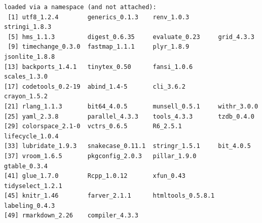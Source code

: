 \documentclass[
  letterpaper,
  DIV=11,
  numbers=noendperiod]{scrartcl}
\begin{document}
\begin{tcolorbox}
\begin{verbatim}
loaded via a namespace (and not attached):
 [1] utf8_1.2.4        generics_0.1.3    renv_1.0.3        stringi_1.8.3    
 [5] hms_1.1.3         digest_0.6.35     evaluate_0.23     grid_4.3.3       
 [9] timechange_0.3.0  fastmap_1.1.1     plyr_1.8.9        jsonlite_1.8.8   
[13] backports_1.4.1   tinytex_0.50      fansi_1.0.6       scales_1.3.0     
[17] codetools_0.2-19  abind_1.4-5       cli_3.6.2         crayon_1.5.2     
[21] rlang_1.1.3       bit64_4.0.5       munsell_0.5.1     withr_3.0.0      
[25] yaml_2.3.8        parallel_4.3.3    tools_4.3.3       tzdb_0.4.0       
[29] colorspace_2.1-0  vctrs_0.6.5       R6_2.5.1          lifecycle_1.0.4  
[33] lubridate_1.9.3   snakecase_0.11.1  stringr_1.5.1     bit_4.0.5        
[37] vroom_1.6.5       pkgconfig_2.0.3   pillar_1.9.0      gtable_0.3.4     
[41] glue_1.7.0        Rcpp_1.0.12       xfun_0.43         tidyselect_1.2.1 
[45] knitr_1.46        farver_2.1.1      htmltools_0.5.8.1 labeling_0.4.3   
[49] rmarkdown_2.26    compiler_4.3.3   
\end{verbatim}

\end{tcolorbox}
\end{document}
